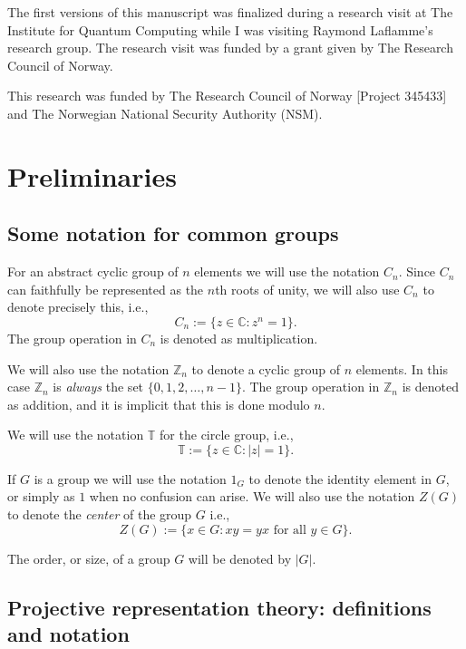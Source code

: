 \documentclass[11pt, oneside, reqno]{amsart}
\newcommand{\bbZ}{\mathbb{Z}}
\newcommand{\bbC}{\mathbb{C}}
\newcommand{\bbT}{\mathbb{T}}
\theoremstyle{definition}
\theoremstyle{plain}
\theoremstyle{remark}
\begin{document}
The first versions of this manuscript was finalized during a research visit at The Institute for Quantum Computing while I was visiting Raymond Laflamme's research group. The research visit was funded by a grant given by The Research Council of Norway.

This research was funded by The Research Council of Norway [Project 345433] and The Norwegian National Security Authority (NSM).

\section{Preliminaries}\label{sec:Preliminaries}

\subsection{Some notation for common groups}

For an abstract cyclic group of $n$ elements we will use the notation $C_n$. Since $C_n$ can faithfully be represented as the $n$th roots of unity, we will also use $C_n$ to denote precisely this, i.e.,
\begin{equation*}
    C_n := \{ z \in \bbC \colon z^n = 1 \}.
\end{equation*}
The group operation in $C_n$ is denoted as multiplication.

We will also use the notation $\bbZ_n$ to denote a cyclic group of $n$ elements. In this case $\bbZ_n$ is \emph{always} the set $\{0,1,2,\dots,n-1\}$. The group operation in $\bbZ_n$ is denoted as addition, and it is implicit that this is done modulo $n$.

We will use the notation $\bbT$ for the circle group, i.e.,
\begin{equation*}
    \bbT := \{ z \in \bbC \colon |z| = 1 \}.
\end{equation*}

If $G$ is a group we will use the notation $1_G$ to denote the identity element in $G$, or simply as $1$ when no confusion can arise. We will also use the notation $Z(G)$ to denote the \emph{center} of the group $G$ i.e.,
\begin{equation*}
    Z(G) := \{ x \in G : xy = yx \text{ for all } y \in G \}.
\end{equation*}

The order, or size, of a group $G$ will be denoted by $|G|$.

\subsection{Projective representation theory: definitions and notation}
\end{document}
